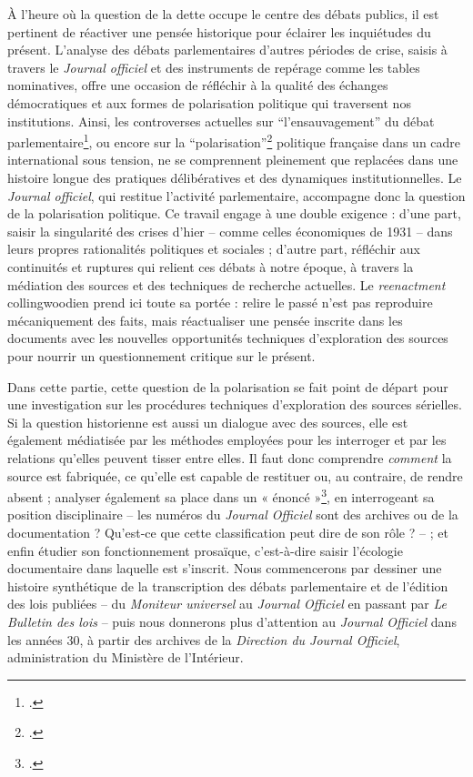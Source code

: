 À l’heure où la question de la dette occupe le centre des débats publics, il est pertinent de réactiver une pensée historique pour éclairer les inquiétudes du présent. L’analyse des débats parlementaires d’autres périodes de crise, saisis à travers le \emph{Journal officiel} et des instruments de repérage comme les tables nominatives, offre une occasion de réfléchir à la qualité des échanges démocratiques et aux formes de polarisation politique qui traversent nos institutions. Ainsi, les controverses actuelles sur \enquote{l’ensauvagement} du débat parlementaire\footcite[][]{ensauvagement}, ou encore sur la \enquote{polarisation}\footcite[][]{polarisation} politique française dans un cadre international sous tension, ne se comprennent pleinement que replacées dans une histoire longue des pratiques délibératives et des dynamiques institutionnelles. Le \emph{Journal officiel}, qui restitue l'activité parlementaire, accompagne donc la question de la polarisation politique. Ce travail engage à une double exigence : d’une part, saisir la singularité des crises d’hier -- comme celles économiques de 1931 -- dans leurs propres rationalités politiques et sociales ; d’autre part, réfléchir aux continuités et ruptures qui relient ces débats à notre époque, à travers la médiation des sources et des techniques de recherche actuelles. Le \emph{reenactment} collingwoodien prend ici toute sa portée : relire le passé n’est pas reproduire mécaniquement des faits, mais réactualiser une pensée inscrite dans les documents avec les nouvelles opportunités techniques d'exploration des sources pour nourrir un questionnement critique sur le présent.

Dans cette partie, cette question de la polarisation se fait point de départ pour une investigation sur les procédures techniques d’exploration des sources sérielles. Si la question historienne est aussi un dialogue avec des sources, elle est également médiatisée par les méthodes employées pour les interroger et par les relations qu’elles peuvent tisser entre elles. Il faut donc comprendre \emph{comment} la source est fabriquée, ce qu’elle est capable de restituer ou, au contraire, de rendre absent ; analyser également sa place dans un « énoncé »\footcite[][]{Foucault}, en interrogeant sa position disciplinaire -- les numéros du \emph{Journal Officiel} sont des archives ou de la documentation ? Qu'est-ce que cette classification peut dire de son rôle ? -- ; et enfin étudier son fonctionnement prosaïque, c’est-à-dire saisir l’écologie documentaire dans laquelle est s'inscrit. Nous commencerons par dessiner une histoire synthétique de la transcription des débats parlementaire et de l'édition des lois publiées -- du \emph{Moniteur universel} au \emph{Journal Officiel} en passant par \emph{Le Bulletin des lois} -- puis nous donnerons plus d'attention au \emph{Journal Officiel} dans les années 30, à partir des archives de la \emph{Direction du Journal Officiel}, administration du Ministère de l'Intérieur.

